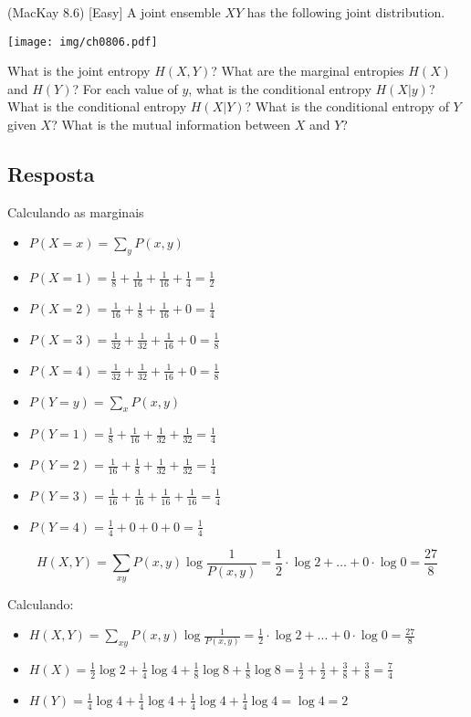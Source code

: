 (MacKay 8.6) [Easy]
A joint ensemble $XY$ has the following joint distribution.

\begin{center}
    \texttt{[image: img/ch0806.pdf]}    
\end{center}


What is the joint entropy $H(X, Y )$? What are the marginal entropies $H(X)$ and $H(Y)$? For each value of $y$, what is the conditional entropy $H(X | y)$? What is the conditional entropy $H(X | Y )$? What is the conditional entropy of $Y$ given $X$? What is the mutual information between $X$ and $Y$?

\subsection*{Resposta}

Calculando as marginais

\begin{itemize}
	\item $P(X = x) = \sum\limits_y {P(x,y)}$
	\item $P(X = 1) = \frac{1}{8} + \frac{1}{{16}} + \frac{1}{{16}} + \frac{1}{4} = \frac{1}{2}$
	\item $P(X = 2) = \frac{1}{{16}} + \frac{1}{8} + \frac{1}{{16}} + 0 = \frac{1}{4}$
	\item $P(X = 3) = \frac{1}{{32}} + \frac{1}{{32}} + \frac{1}{{16}} + 0 = \frac{1}{8}$
	\item $P(X = 4) = \frac{1}{{32}} + \frac{1}{{32}} + \frac{1}{{16}} + 0 = \frac{1}{8}$
	\item $P(Y = y) = \sum\limits_x {P(x,y)}$
	\item $P(Y = 1) = \frac{1}{8} + \frac{1}{{16}} + \frac{1}{{32}} + \frac{1}{{32}} = \frac{1}{4}$
	\item $P(Y = 2) = \frac{1}{{16}} + \frac{1}{8} + \frac{1}{{32}} + \frac{1}{{32}} = \frac{1}{4}$
	\item $P(Y = 3) = \frac{1}{{16}} + \frac{1}{{16}} + \frac{1}{{16}} + \frac{1}{{16}} = \frac{1}{4}$
	\item $P(Y = 4) = \frac{1}{4} + 0 + 0 + 0 = \frac{1}{4}$
\end{itemize}

\[H(X,Y) = \sum\limits_{xy} {P(x,y)\log \frac{1}{{P(x,y)}}}  = \frac{1}{2} \cdot \log 2 +  \ldots  + 0 \cdot \log 0 = \frac{{27}}{8}\]

Calculando:

\begin{itemize}
    \item $H(X,Y) = \sum\limits_{xy} {P(x,y)\log \frac{1}{{P(x,y)}}}  = \frac{1}{2} \cdot \log 2 +  \ldots  + 0 \cdot \log 0 = \frac{{27}}{8}$
    
    \item $H(X) = \frac{1}{2}\log 2 + \frac{1}{4}\log 4 + \frac{1}{8}\log 8 + \frac{1}{8}\log 8 = \frac{1}{2} + \frac{1}{2} + \frac{3}{8} + \frac{3}{8} = \frac{7}{4}$
    
    \item $H(Y) = \frac{1}{4}\log 4 + \frac{1}{4}\log 4 + \frac{1}{4}\log 4 + \frac{1}{4}\log 4 = \log 4 = 2$
    
\end{itemize}

